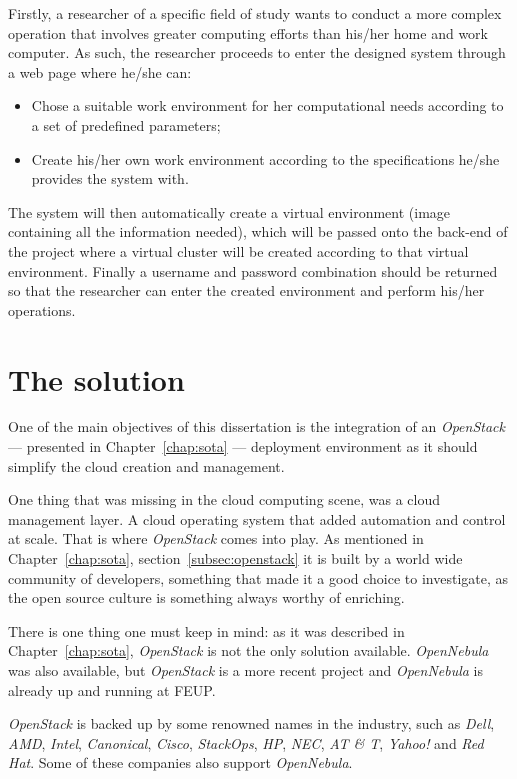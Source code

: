 Firstly, a researcher of a specific field of study wants to conduct a more complex operation that involves greater computing efforts than his/her home and work computer. As such, the researcher proceeds to enter the designed system through a web page where he/she can:

\begin{itemize}
	\item Chose a suitable work environment for her computational needs according to a set of predefined parameters;
	\item Create his/her own work environment according to the specifications he/she provides the system with.
\end{itemize}

The system will then automatically create a virtual environment (image containing all the information needed), which will be passed onto the back-end of the project where a virtual cluster will be created according to that virtual environment.
Finally a username and password combination should be returned so that the researcher can enter the created environment and perform his/her operations. 

\section{The solution}\label{sec:solution}

One of the main objectives of this dissertation is the integration of an \textit{OpenStack} --- presented in Chapter~\ref{chap:sota} --- deployment environment as it should simplify the cloud creation and management.

One thing that was missing in the cloud computing scene, was a cloud management layer. A cloud operating system that added automation and control at scale. That is where \textit{OpenStack} comes into play. As mentioned in Chapter~\ref{chap:sota}, section~\ref{subsec:openstack} it is built by a world wide community of developers, something that made it a good choice to investigate, as the open source culture is something always worthy of enriching.~\cite{stackgithub}

There is one thing one must keep in mind: as it was described in Chapter~\ref{chap:sota}, \textit{OpenStack} is not the only solution available. \textit{OpenNebula} was also available, but \textit{OpenStack} is a more recent project and \textit{OpenNebula} is already up and running at FEUP. 

\textit{OpenStack} is backed up by some renowned names in the industry, such as \textit{Dell}, \textit{AMD}, \textit{Intel}, \textit{Canonical}, \textit{Cisco}, \textit{StackOps}, \textit{HP}, \textit{NEC}, \textit{AT \& T}, \textit{Yahoo!} and \textit{Red Hat}. Some of these companies also support \textit{OpenNebula}.
 
